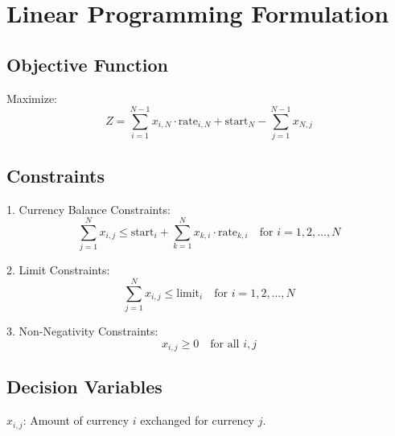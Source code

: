 \documentclass{article}
\begin{document}
\section*{Linear Programming Formulation}

\subsection*{Objective Function}
Maximize:
\[
Z = \sum_{i=1}^{N-1} x_{i,N} \cdot \text{rate}_{i,N} + \text{start}_N - \sum_{j=1}^{N-1} x_{N,j}
\]

\subsection*{Constraints}

1. Currency Balance Constraints:
   \[
   \sum_{j=1}^{N} x_{i,j} \leq \text{start}_i + \sum_{k=1}^{N} x_{k,i} \cdot \text{rate}_{k,i} \quad \text{for } i = 1, 2, \ldots, N
   \]

2. Limit Constraints:
   \[
   \sum_{j=1}^{N} x_{i,j} \leq \text{limit}_i \quad \text{for } i = 1, 2, \ldots, N
   \]

3. Non-Negativity Constraints:
   \[
   x_{i,j} \geq 0 \quad \text{for all } i, j
   \]

\subsection*{Decision Variables}
\( x_{i,j} \): Amount of currency \( i \) exchanged for currency \( j \).
\end{document}
